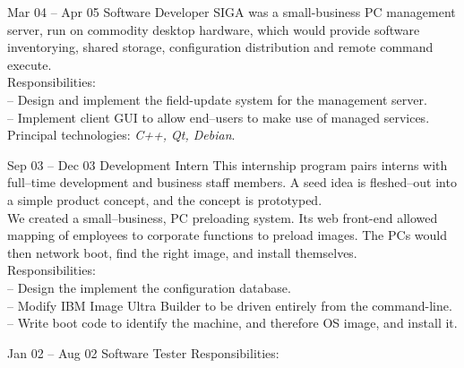 \documentclass[letterpaper, 11pt]{article}
\begin{document}
\begin{resume}
\begin{block}
\begin{category}{}
            \end{category}
            \begin{subcategory}{Mar 04 -- Apr 05}
                 {Software Developer}
                SIGA was a small-business PC management server, run on commodity desktop
                hardware, which would provide software inventorying, shared storage,
                configuration distribution and remote command execute.
                \\[1ex]
                Responsibilities: \\
                -- Design and implement the field-update system for the management server. \\
                -- Implement client GUI to allow end--users to make use of managed services.
                \\[1ex]
                Principal technologies: \emph{C++, Qt, Debian}.
                \bigskip
            \end{subcategory}
            \begin{subcategory}{Sep 03 -- Dec 03}
                 {Development Intern}
                This internship program pairs interns with full--time development and
                business staff members.  A seed idea is fleshed--out into a simple
                product concept, and the concept is prototyped.
                \\[1ex]
                We created a small--business, PC preloading system.  Its web front-end allowed
                mapping of employees to corporate functions to preload images.  The PCs would
                then network boot, find the right image, and install themselves.
                \\[1ex]
                Responsibilities: \\
                -- Design the implement the configuration database. \\
                -- Modify IBM Image Ultra Builder to be driven entirely from the command-line. \\
                -- Write boot code to identify the machine, and therefore OS image, and install it.
                \bigskip
            \end{subcategory}
            \begin{subcategory}{Jan 02 -- Aug 02}
                 {Software Tester}
                Responsibilities: \\

\end{subcategory}
\end{block}
\end{resume}
\end{document}
